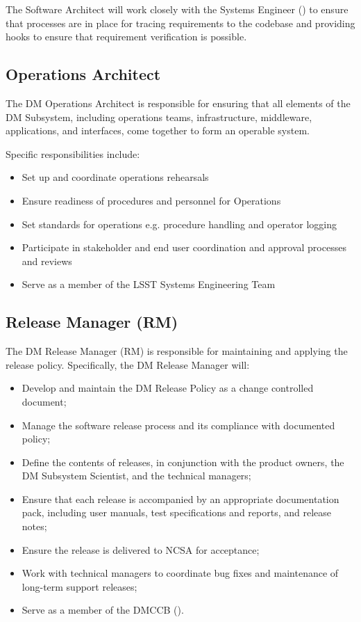 The Software Architect will work closely with the \gls{Systems Engineer} () to ensure that processes are in place for tracing requirements to the codebase and providing hooks to ensure that requirement verification is possible.

\subsection{Operations Architect \label{role:opsarc}}

The \gls{DM} \gls{Operations} Architect is responsible for ensuring that all elements of the \gls{DM} \gls{Subsystem}, including operations teams, infrastructure, middleware, applications, and interfaces,
come together to form an operable system.

Specific responsibilities include:

\begin{itemize}
\item Set up and coordinate operations rehearsals
\item Ensure readiness of procedures and personnel for \gls{Operations}
\item Set standards for operations e.g. procedure handling and operator logging
\item Participate in stakeholder and end user coordination and approval processes and reviews
\item Serve as a member of the \gls{LSST} \gls{Systems Engineering} Team
\end{itemize}

\subsection{Release Manager (\gls{RM})}\label{role:dmrm}

The \gls{DM} \gls{Release} Manager (\gls{RM}) is responsible for maintaining and applying the release policy.
Specifically, the \gls{DM} \gls{Release} Manager will:

\begin{itemize}

  \item{Develop and maintain the \gls{DM} \gls{Release} Policy as a change controlled
  document;}
  \item{Manage the software release process and its compliance with documented
  policy;}
  \item{Define the contents of releases, in conjunction with the product
  owners, the \gls{DM} \gls{Subsystem Scientist}, and the technical managers;}
  \item{Ensure that each release is accompanied by an appropriate
  documentation pack, including user manuals, test specifications and reports,
  and release notes;}
  \item{Ensure the release is delivered to \gls{NCSA} for acceptance;}
  \item{Work with technical managers to coordinate bug fixes and maintenance
  of long-term support releases;}
  \item{Serve as a member of the \gls{DMCCB} ().}

\end{itemize}

